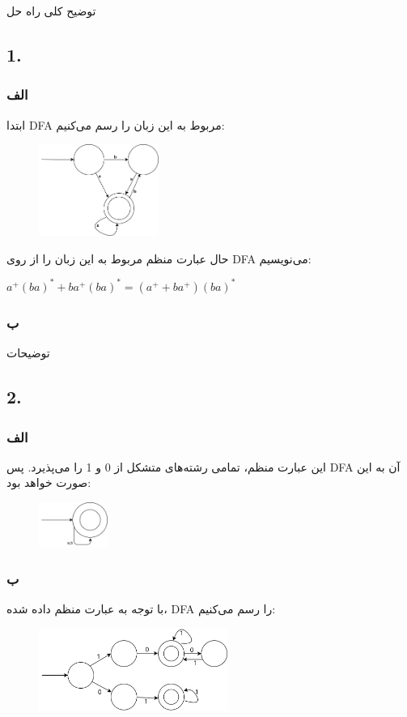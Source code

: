 توضیح کلی راه حل


\subsection*{1.}
\subsubsection*{الف}
ابتدا DFA مربوط به این زبان را رسم می‌کنیم:
\begin{figure}[htbp]
	\centering
	\includegraphics[width=0.35\textwidth]{q3s1p1.png}
\end{figure}

حال عبارت منظم مربوط به این زبان را از روی DFA می‌نویسیم:
\setLTR

{\large \textbf{$a^+(ba)^* + ba^+(ba)^* = (a^+ + ba^+)(ba)^*$}}

\setRTL

\subsubsection*{ب}

توضیحات

\subsection*{2.}
\subsubsection*{الف}
این عبارت منظم، تمامی رشته‌های متشکل از 0 و 1 را می‌پذیرد. پس DFA آن به این صورت خواهد بود:

\begin{figure}[htbp]
	\centering
	\includegraphics[width=0.20\textwidth]{q3s2p1.png}
\end{figure}



\subsubsection*{ب}
با توجه به عبارت منظم داده شده، DFA را رسم می‌کنیم:
\begin{figure}[htbp]
	\centering
	\includegraphics[width=0.55\textwidth]{q3s2p2.png}
\end{figure}

